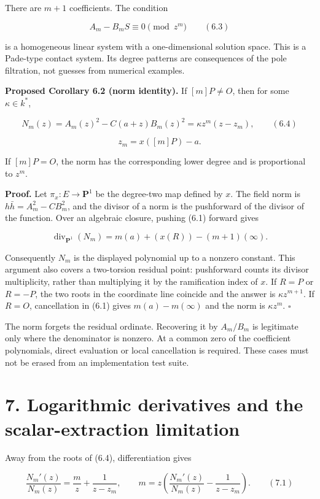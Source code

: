 \documentclass[
  11pt,
  a4paper,
]{article}
\begin{document}
There are \(m+1\) coefficients. The condition

\[
A_m-B_mS\equiv0\pmod{z^m} \qquad (6.3)
\]

is a homogeneous linear system with a one-dimensional solution space.
This is a Pade-type contact system. Its degree patterns are consequences
of the pole filtration, not guesses from numerical examples.

\textbf{Proposed Corollary 6.2 (norm identity).} If \([m]P\neq O\), then
for some \(\kappa\in k^*\),

\[
N_m(z)=A_m(z)^2-C(a+z)B_m(z)^2
       =\kappa z^m(z-z_m), \qquad (6.4)
\]

\[
z_m=x([m]P)-a.
\]

If \([m]P=O\), the norm has the corresponding lower degree and is
proportional to \(z^m\).

\textbf{Proof.} Let \(\pi_x:E\to\mathbf P^1\) be the degree-two map
defined by \(x\). The field norm is \(h\bar h=A_m^2-CB_m^2\), and the
divisor of a norm is the pushforward of the divisor of the function.
Over an algebraic closure, pushing (6.1) forward gives

\[
\operatorname{div}_{\mathbf P^1}(N_m)
=m(a)+(x(R))-(m+1)(\infty).
\]

Consequently \(N_m\) is the displayed polynomial up to a nonzero
constant. This argument also covers a two-torsion residual point:
pushforward counts its divisor multiplicity, rather than multiplying it
by the ramification index of \(x\). If \(R=P\) or \(R=-P\), the two
roots in the coordinate line coincide and the answer is
\(\kappa z^{m+1}\). If \(R=O\), cancellation in (6.1) gives
\(m(a)-m(\infty)\) and the norm is \(\kappa z^m\). \(\square\)

The norm forgets the residual ordinate. Recovering it by \(A_m/B_m\) is
legitimate only where the denominator is nonzero. At a common zero of
the coefficient polynomials, direct evaluation or local cancellation is
required. These cases must not be erased from an implementation test
suite.

\section{7. Logarithmic derivatives and the scalar-extraction
limitation}\label{logarithmic-derivatives-and-the-scalar-extraction-limitation}

Away from the roots of (6.4), differentiation gives

\[
\frac{N_m'(z)}{N_m(z)}=\frac{m}{z}+\frac1{z-z_m},\qquad
m=z\left(\frac{N_m'(z)}{N_m(z)}-\frac1{z-z_m}\right). \qquad (7.1)
\]
\end{document}
